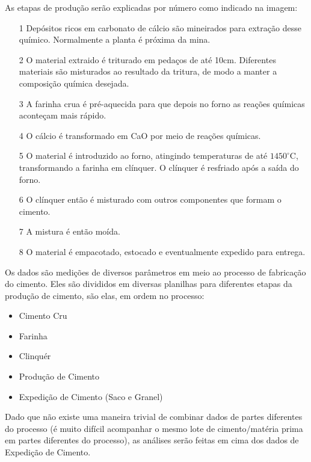 As etapas de produção serão explicadas por número como indicado na imagem: \\

\begin{itemize}

\item[1] Depósitos ricos em carbonato de cálcio são mineirados para extração desse químico. Normalmente a planta é próxima da mina.
\item[2] O material extraido é triturado em pedaços de até 10cm. Diferentes materiais são misturados ao resultado da tritura, de modo a manter a composição química desejada. 
\item[3] A farinha crua é pré-aquecida para que depois no forno as reações químicas aconteçam mais rápido. 
\item[4] O cálcio é transformado em CaO por meio de reações químicas.  
\item[5] O material é introduzido ao forno, atingindo temperaturas de até $1450^\circ$C, transformando a farinha em clínquer. O clínquer é resfriado após a saída do forno. 
\item[6] O clínquer então é misturado com outros componentes que formam o cimento.
\item[7] A mistura é então moída.
\item[8] O material é empacotado, estocado e eventualmente expedido para entrega.

\end{itemize}

Os dados são medições de diversos parâmetros em meio ao processo de fabricação do cimento. Eles são divididos em diversas planilhas para diferentes etapas da produção de cimento, são elas, em ordem no processo:

\begin{itemize}
        \item Cimento Cru
        \item Farinha
        \item Clinquér
        \item Produção de Cimento
        \item Expedição de Cimento (Saco e Granel)
\end{itemize}

Dado que não existe uma maneira trivial de combinar dados de partes diferentes do processo (é muito difícil acompanhar o mesmo lote de cimento/matéria prima em partes diferentes do processo), as análises serão feitas em cima dos dados de Expedição de Cimento.

